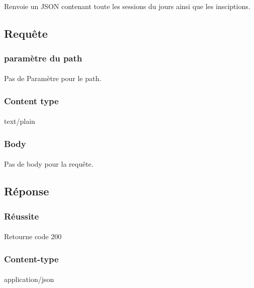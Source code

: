 \paragraph{}
	Renvoie un JSON contenant toute les sessions du jours ainsi que les insciptions.

\subsection{Requête}
	\subsubsection{paramètre du path}
		\paragraph{}
			Pas de Paramètre pour le path.
	
	\subsubsection{Content type}
		\paragraph{}
			text/plain
			
	\subsubsection{Body}
		\paragraph{}
			Pas de body pour la requête.

\subsection{Réponse}
	\subsubsection{Réussite}
		\paragraph{}
			Retourne code 200
			
	\subsubsection{Content-type}
		\paragraph{}
			application/json
	
